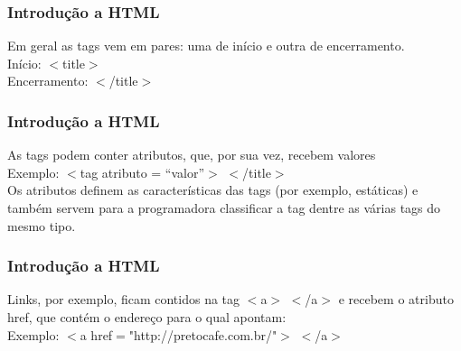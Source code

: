 \documentclass[11pt]{beamer}
\begin{document}
\begin{frame}
	\frametitle{Introdução a HTML}
	Em geral as tags vem em pares: uma de início e outra de encerramento.
	\newline\\
	Início: $<$title$>$\\
	Encerramento: $<$/title$>$
\end{frame}

\begin{frame}
	\frametitle{Introdução a HTML}
	As tags podem conter atributos, que, por sua vez, recebem valores
	\newline\\
	Exemplo: $<$tag atributo = ``valor''$>$ $<$/title$>$
	\newline\\
	Os atributos definem as características das tags (por exemplo, estáticas) e também servem para a programadora classificar a tag dentre as várias tags do mesmo tipo.
\end{frame}

\begin{frame}
	\frametitle{Introdução a HTML}
	Links, por exemplo, ficam contidos na tag $<$a$>$ $<$/a$>$ e recebem o atributo href, que contém o endereço para o qual apontam:
	\newline\\
	Exemplo: $<$a href$=$"http://pretocafe.com.br/"$>$ $<$/a$>$
\end{frame}
\end{document}
